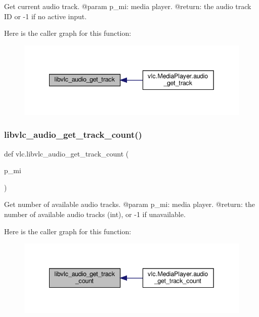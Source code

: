 \begin{DoxyVerb}Get current audio track.
@param p_mi: media player.
@return: the audio track ID or -1 if no active input.
\end{DoxyVerb}
 Here is the caller graph for this function\+:
\nopagebreak
\begin{figure}[H]
\begin{center}
\leavevmode
\includegraphics[width=342pt]{namespacevlc_aacb5cb891887883b6969a152656bfb75_icgraph}
\end{center}
\end{figure}
\mbox{\label{namespacevlc_a7a1549dd2aa2d4cbd98a3fcc8da9cb09}} 
\subsubsection{\texorpdfstring{libvlc\+\_\+audio\+\_\+get\+\_\+track\+\_\+count()}{libvlc\_audio\_get\_track\_count()}}
{\footnotesize\ttfamily def vlc.\+libvlc\+\_\+audio\+\_\+get\+\_\+track\+\_\+count (\begin{DoxyParamCaption}\item[{}]{p\+\_\+mi }\end{DoxyParamCaption})}

\begin{DoxyVerb}Get number of available audio tracks.
@param p_mi: media player.
@return: the number of available audio tracks (int), or -1 if unavailable.
\end{DoxyVerb}
 Here is the caller graph for this function\+:
\nopagebreak
\begin{figure}[H]
\begin{center}
\leavevmode
\includegraphics[width=342pt]{namespacevlc_a7a1549dd2aa2d4cbd98a3fcc8da9cb09_icgraph}
\end{center}
\end{figure}
\mbox{\label{namespacevlc_aeef886dffdb2d28ef62fb5a2314c69b3}} 
